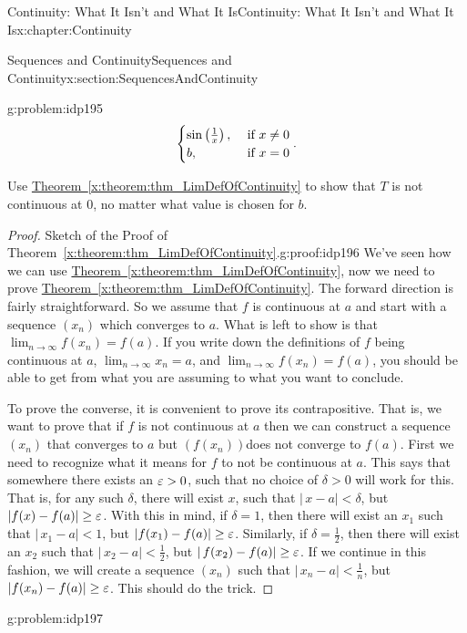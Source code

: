 \begin{chapterptx}{Continuity: What It Isn't and What It Is}{}{Continuity: What It Isn't and What It Is}{}{}{x:chapter:Continuity}
\begin{sectionptx}{Sequences and Continuity}{}{Sequences and Continuity}{}{}{x:section:SequencesAndContinuity}
\begin{problem}{}{g:problem:idp195}
\begin{equation*}
\begin{cases}
					\sin\left(\frac{1}{x}\right),& \text{ if } x\neq 0\\ 
					b,& \text{ if } x=0 \end{cases} \text{.}
			\end{equation*}
			\par
			Use \hyperref[x:theorem:thm_LimDefOfContinuity]{Theorem~{\xreffont\ref{x:theorem:thm_LimDefOfContinuity}}} to show that \(T\) is not continuous at \(0\), no matter what value is chosen for \(b\).%
		\end{problem}
		\begin{proof}{Sketch of the Proof of Theorem~{\xreffont\ref*{x:theorem:thm_LimDefOfContinuity}}.}{g:proof:idp196}
			We've seen how we can use \hyperref[x:theorem:thm_LimDefOfContinuity]{Theorem~{\xreffont\ref{x:theorem:thm_LimDefOfContinuity}}}, now we need to prove \hyperref[x:theorem:thm_LimDefOfContinuity]{Theorem~{\xreffont\ref{x:theorem:thm_LimDefOfContinuity}}}.  The forward direction is fairly straightforward.  So we assume that \(f\) is continuous at \(a\) and start with a sequence \(\left(x_n\right)\) which converges to \(a\). What is left to show is that \(\lim_{n\rightarrow\infty}f(x_n)=f(a)\).  If you write down the definitions of \(f\) being continuous at \(a\), \(\lim_{n\rightarrow\infty}x_n=a\), and \(\lim_{n\rightarrow\infty}f(x_n)=f(a)\), you should be able to get from what you are assuming to what you want to conclude.%
			\par
			To prove the converse, it is convenient to prove its contrapositive.  That is, we want to prove that if \(f\) is not continuous at \(a\) then we can construct a sequence \(\left(x_n\right)\) that converges to \(a\) but \(\left(f(x_n)\right)\)does not converge to \(f(a)\). First we need to recognize what it means for \(f\) to not be continuous at \(a\).  This says that somewhere there exists an \(\varepsilon>0\), such that no choice of \(\delta>0\) will work for this.  That is, for any such \(\delta\), there will exist \(x\), such that \(|\,x-a|\lt \delta\), but \(|f(x)-f(a)|\geq\varepsilon\). With this in mind, if \(\delta=1\), then there will exist an \(x_1\) such that \(|\,x_1-a|\lt 1\), but \(|f(x_1)-f(a)|\geq\varepsilon\).  Similarly, if \(\delta=\frac{1}{2}\), then there will exist an \(x_2\) such that \(|\,x_2-a|\lt \frac{1}{2}\), but \(|\,f(x_2)-f(a)|\geq\varepsilon\).  If we continue in this fashion, we will create a sequence \(\left(x_n\right)\) such that \(|\,x_n-a|\lt \frac{1}{n}\), but \(|f(x_n)-f(a)|\geq\varepsilon\).  This should do the trick.%
		\end{proof}
		\begin{problem}{}{g:problem:idp197}%

\end{problem}
\end{sectionptx}
\end{chapterptx}
